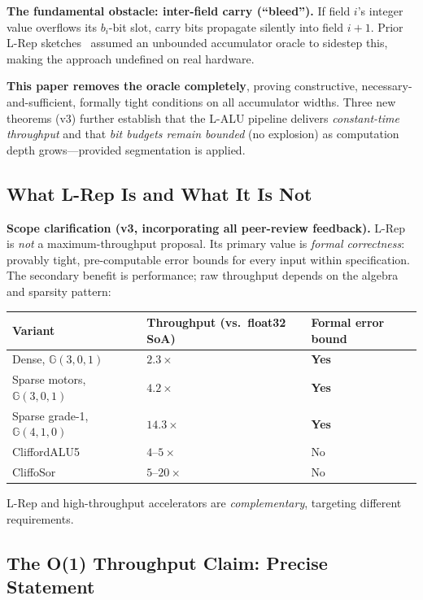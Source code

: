 \documentclass[11pt,a4paper]{article}
\theoremstyle{definition}
\theoremstyle{plain}
\theoremstyle{remark}
\newcommand{\GA}{\mathbb{G}}
\begin{document}
\textbf{The fundamental obstacle: inter-field carry (``bleed'').}
If field $i$'s integer value overflows its $b_i$-bit slot,
carry bits propagate silently into field $i+1$.
Prior L-Rep sketches~\cite{dang2025sketch} assumed an unbounded
accumulator oracle to sidestep this, making the approach
undefined on real hardware.

\textbf{This paper removes the oracle completely}, proving
constructive, necessary-and-sufficient, formally tight conditions
on all accumulator widths.
Three new theorems (v3) further establish that the L-ALU pipeline
delivers \emph{constant-time throughput} and that \emph{bit budgets
remain bounded} (no explosion) as computation depth grows---provided
segmentation is applied.

\subsection{What L-Rep Is and What It Is Not}

\begin{warningbox}
\textbf{Scope clarification (v3, incorporating all peer-review feedback).}
L-Rep is \emph{not} a maximum-throughput proposal.
Its primary value is \emph{formal correctness}:
provably tight, pre-computable error bounds for every input within
specification.
The secondary benefit is performance;
raw throughput depends on the algebra and sparsity pattern:

\smallskip
\begin{tabular}{lll}
\toprule
Variant & Throughput (vs.\ float32 SoA) & Formal error bound \\
\midrule
Dense, $\GA(3,0,1)$ & $2.3\times$ & \textbf{Yes} \\
Sparse motors, $\GA(3,0,1)$ & $4.2\times$ & \textbf{Yes} \\
Sparse grade-1, $\GA(4,1,0)$ & $14.3\times$ & \textbf{Yes} \\
CliffordALU5~\cite{cliffordalu5} & $4$--$5\times$ & No \\
CliffoSor~\cite{cliffosor} & $5$--$20\times$ & No \\
\bottomrule
\end{tabular}
\smallskip

L-Rep and high-throughput accelerators are \emph{complementary},
targeting different requirements.
\end{warningbox}

\subsection{The O(1) Throughput Claim: Precise Statement}
\end{document}
